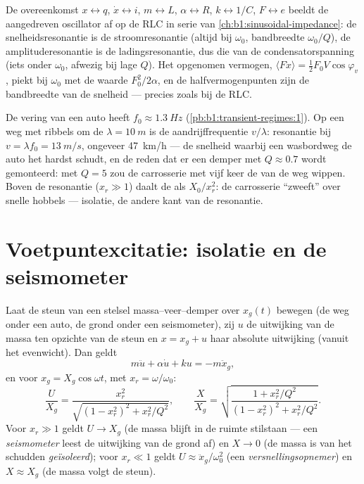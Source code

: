 \begin{remark}\label{rem:b1:oscillators-resonance:analogy}
De overeenkomst $x \leftrightarrow q$, $\dot x \leftrightarrow i$,
$m \leftrightarrow L$, $\alpha \leftrightarrow R$, $k \leftrightarrow 1/C$,
$F \leftrightarrow e$ beeldt de aangedreven oscillator af op de RLC in serie van
\cref{ch:b1:sinusoidal-impedance}: de snelheidsresonantie is de
stroomresonantie (altijd bij $\omega_0$, bandbreedte $\omega_0/Q$), de
amplituderesonantie is de ladingsresonantie, dus die van de condensatorspanning (iets
onder $\omega_0$, afwezig bij lage $Q$). Het opgenomen vermogen, $\langle F\dot x\rangle
= \tfrac12 F_0V\cos\varphi_v$, piekt bij $\omega_0$ met de waarde $F_0^2/2\alpha$,
en de halfvermogenpunten zijn de bandbreedte van de snelheid --- precies zoals bij
de RLC.
\end{remark}

\begin{example}[Resonantiesnelheden]\label{ex:b1:oscillators-resonance:road}
De vering van een auto heeft $f_0 \approx \qty{1.3}{Hz}$ (\cref{pb:b1:transient-regimes:1}).
Op een weg met ribbels om de $\lambda = \qty{10}{m}$ is de aandrijffrequentie
$v/\lambda$: resonantie bij $v = \lambda f_0 = \qty{13}{m/s}$,
ongeveer \qty{47}{km/h} --- de snelheid waarbij een wasbordweg de
auto het hardst schudt, en de reden dat er een demper met $Q \approx 0.7$ wordt gemonteerd:
met $Q = 5$ zou de carrosserie met vijf keer de  van de weg
wippen. Boven de resonantie ($x_r \gg 1$) daalt de  als
$X_0/x_r^2$: de carrosserie ``zweeft'' over snelle hobbels --- isolatie, de andere
kant van de resonantie.
\end{example}

\section{Voetpuntexcitatie: isolatie en de seismometer}

\begin{proposition}\label{prop:b1:oscillators-resonance:base}
Laat de steun van een stelsel massa--veer--demper over $x_g(t)$ bewegen (de weg
onder een auto, de grond onder een seismometer), zij $u$ de
uitwijking van de massa ten opzichte van de steun en $x = x_g + u$ haar
absolute uitwijking (vanuit het evenwicht). Dan geldt
\[
m\ddot u + \alpha\dot u + ku = -m\ddot x_g ,
\]
en voor $x_g = X_g\cos\omega t$, met $x_r = \omega/\omega_0$:
\[
\frac{U}{X_g} = \frac{x_r^2}{\sqrt{(1 - x_r^2)^2 + x_r^2/Q^2}},
\qquad
\frac{X}{X_g} = \sqrt{\frac{1 + x_r^2/Q^2}{(1 - x_r^2)^2 + x_r^2/Q^2}} .
\]
Voor $x_r \gg 1$ geldt $U \to X_g$ (de massa blijft in de ruimte stilstaan --- een
\emph{seismometer} leest de uitwijking van de grond af) en $X \to 0$ (de
massa is van het schudden \emph{geïsoleerd}); voor $x_r \ll 1$ geldt $U \approx
\ddot x_g/\omega_0^2$ (een \emph{versnellingsopnemer}) en $X \approx X_g$ (de massa
volgt de steun).
\end{proposition}

